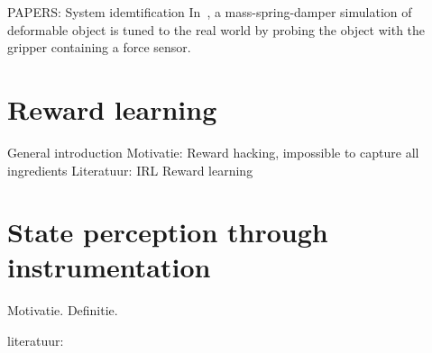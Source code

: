 \documentclass[\home/main.tex]{subfiles}
\begin{document}
PAPERS:
	System idemtification
		In~\autocite{Howard2000}, a mass-spring-damper simulation of deformable object is tuned to the real world by probing the object with the gripper containing a force sensor. 

\section{Reward learning}  \label{sec:lit_reward_learning}
General introduction 
Motivatie: Reward hacking, impossible to capture all ingredients
Literatuur: 
	IRL 
	Reward learning 

\section{State perception through instrumentation} \label{sec:lit_instrumentation}
Motivatie.
Definitie.

literatuur:
\end{document}

